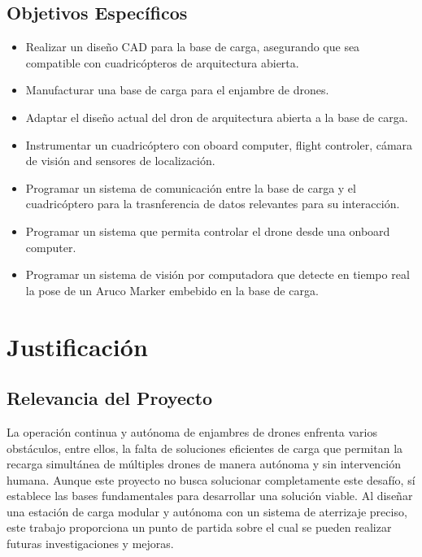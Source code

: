 \subsection{Objetivos Específicos}

\begin{itemize}
    \item Realizar un diseño CAD para la base de carga, asegurando que sea compatible con cuadricópteros de arquitectura abierta.
    \item Manufacturar una base de carga para el enjambre de drones.
    \item Adaptar el diseño actual del dron de arquitectura abierta a la base de carga.
    \item Instrumentar un cuadricóptero con oboard computer, flight controler, cámara de visión and sensores de localización.
    \item Programar un sistema de comunicación entre la base de carga y el cuadricóptero para la trasnferencia de datos relevantes para su interacción.
    \item Programar un sistema que permita controlar el drone desde una onboard computer.
    \item Programar un sistema de visión por computadora que detecte en tiempo real la pose de un Aruco Marker embebido en la base de carga.
\end{itemize}

\section{Justificación}

\subsection{Relevancia del Proyecto}

La operación continua y autónoma de enjambres de drones enfrenta varios obstáculos, entre ellos, la falta de soluciones eficientes de carga que permitan la recarga simultánea de múltiples drones de manera autónoma y sin intervención humana. Aunque este proyecto no busca solucionar completamente este desafío, sí establece las bases fundamentales para desarrollar una solución viable. Al diseñar una estación de carga modular y autónoma con un sistema de aterrizaje preciso, este trabajo proporciona un punto de partida sobre el cual se pueden realizar futuras investigaciones y mejoras.

